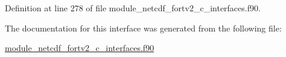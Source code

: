 Definition at line 278 of file module\+\_\+netcdf\+\_\+fortv2\+\_\+c\+\_\+interfaces.\+f90.



The documentation for this interface was generated from the following file\+:\begin{DoxyCompactItemize}
\item 
\hyperlink{module__netcdf__fortv2__c__interfaces_8f90}{module\+\_\+netcdf\+\_\+fortv2\+\_\+c\+\_\+interfaces.\+f90}\end{DoxyCompactItemize}
